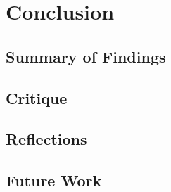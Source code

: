 \section{Conclusion}\label{sec:conclusion}

\subsection{Summary of Findings}
\label{subsec:conclusion-summary}

\subsection{Critique}
\label{subsec:conclusion-critique}

\subsection{Reflections}
\label{subsec:conclusion-reflections}

\subsection{Future Work}
\label{subsec:conclusion-future-work}